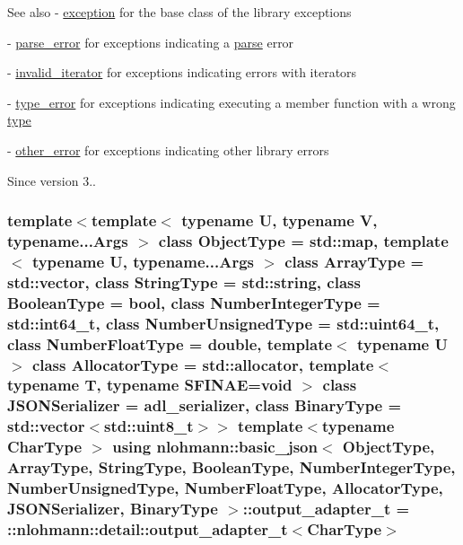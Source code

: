 \begin{DoxySeeAlso}{See also}
-\/ \hyperlink{classnlohmann_1_1basic__json_a14824c27188d2fee4861806cd5f23d22}{exception} for the base class of the library exceptions 

-\/ \hyperlink{classnlohmann_1_1basic__json_a555b05e9da63d486126759922685a37a}{parse\+\_\+error} for exceptions indicating a \hyperlink{classnlohmann_1_1basic__json_a15018ade392a844ea32d5188d1a0b9c6}{parse} error 

-\/ \hyperlink{classnlohmann_1_1basic__json_a6ccc9788413fd58de998fe92743cb4aa}{invalid\+\_\+iterator} for exceptions indicating errors with iterators 

-\/ \hyperlink{classnlohmann_1_1basic__json_ace5bf851eafe85bd6332f978991bc11c}{type\+\_\+error} for exceptions indicating executing a member function with a wrong \hyperlink{classnlohmann_1_1basic__json_a5b7c4b35a0ad9f97474912a08965d7ad}{type} 

-\/ \hyperlink{classnlohmann_1_1basic__json_a6fc373c99facc37aadbc5651b3d6631d}{other\+\_\+error} for exceptions indicating other library errors
\end{DoxySeeAlso}
\begin{DoxySince}{Since}
version 3.. 
\end{DoxySince}
\subsubsection[{\texorpdfstring{output\+\_\+adapter\+\_\+t}{output_adapter_t}}]{\setlength{\rightskip}{0pt plus 5cm}template$<$template$<$ typename U, typename V, typename...\+Args $>$ class Object\+Type = std\+::map, template$<$ typename U, typename...\+Args $>$ class Array\+Type = std\+::vector, class String\+Type  = std\+::string, class Boolean\+Type  = bool, class Number\+Integer\+Type  = std\+::int64\+\_\+t, class Number\+Unsigned\+Type  = std\+::uint64\+\_\+t, class Number\+Float\+Type  = double, template$<$ typename U $>$ class Allocator\+Type = std\+::allocator, template$<$ typename T, typename S\+F\+I\+N\+A\+E=void $>$ class J\+S\+O\+N\+Serializer = adl\+\_\+serializer, class Binary\+Type  = std\+::vector$<$std\+::uint8\+\_\+t$>$$>$ template$<$typename Char\+Type $>$ using {\bf nlohmann\+::basic\+\_\+json}$<$ Object\+Type, Array\+Type, String\+Type, Boolean\+Type, Number\+Integer\+Type, Number\+Unsigned\+Type, Number\+Float\+Type, Allocator\+Type, J\+S\+O\+N\+Serializer, Binary\+Type $>$\+::{\bf output\+\_\+adapter\+\_\+t} =  \+::{\bf nlohmann\+::detail\+::output\+\_\+adapter\+\_\+t}$<$Char\+Type$>$\hspace{0.3cm}{\ttfamily [private]}}\hypertarget{classnlohmann_1_1basic__json_ac4927a4f303011cd45b99f2a7c18c866}{}\label{classnlohmann_1_1basic__json_ac4927a4f303011cd45b99f2a7c18c866}
